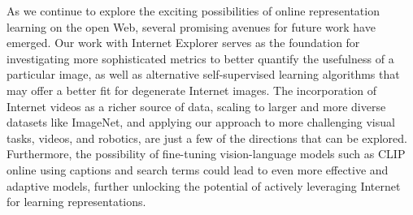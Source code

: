 As we continue to explore the exciting possibilities of online representation learning on the open Web, several promising avenues for future work have emerged. Our work with Internet Explorer serves as the foundation for investigating more sophisticated metrics to better quantify the usefulness of a particular image, as well as alternative self-supervised learning algorithms that may offer a better fit for degenerate Internet images. The incorporation of Internet videos as a richer source of data, scaling to larger and more diverse datasets like ImageNet, and applying our approach to more challenging visual tasks, videos, and robotics, are just a few of the directions that can be explored. Furthermore, the possibility of fine-tuning vision-language models such as CLIP online using captions and search terms could lead to even more effective and adaptive models, further unlocking the potential of actively leveraging Internet for learning representations.



